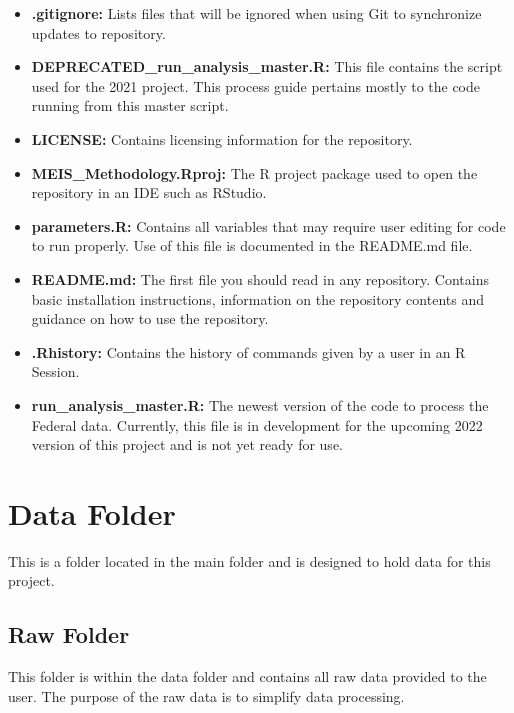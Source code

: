 \documentclass[
]{book}
\providecommand{\tightlist}{%
  \setlength{\itemsep}{0pt}\setlength{\parskip}{0pt}}
\begin{document}
\begin{itemize}
\tightlist
\item
  \textbf{.gitignore:} Lists files that will be ignored when using Git to synchronize updates to repository.
\item
  \textbf{DEPRECATED\_run\_analysis\_master.R:} This file contains the script used for the 2021 project. This process guide pertains mostly to the code running from this master script.
\item
  \textbf{LICENSE:} Contains licensing information for the repository.
\item
  \textbf{MEIS\_Methodology.Rproj:} The R project package used to open the repository in an IDE such as RStudio.
\item
  \textbf{parameters.R:} Contains all variables that may require user editing for code to run properly. Use of this file is documented in the README.md file.
\item
  \textbf{README.md:} The first file you should read in any repository. Contains basic installation instructions, information on the repository contents and guidance on how to use the repository.
\item
  \textbf{.Rhistory:} Contains the history of commands given by a user in an R Session.
\item
  \textbf{run\_analysis\_master.R:} The newest version of the code to process the Federal data. Currently, this file is in development for the upcoming 2022 version of this project and is not yet ready for use.
\end{itemize}

\hypertarget{data-folder}{%
\section{Data Folder}\label{data-folder}}

This is a folder located in the main folder and is designed to hold data for this project.

\hypertarget{raw-folder}{%
\subsection{Raw Folder}\label{raw-folder}}

This folder is within the data folder and contains all raw data provided to the user. The purpose of the raw data is to simplify data processing.
\end{document}
